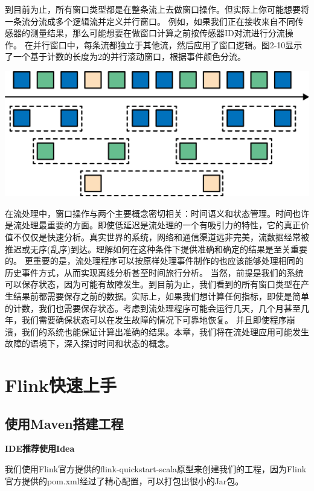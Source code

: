 \documentclass[oneside]{ctexbook}
\begin{document}
到目前为止，所有窗口类型都是在整条流上去做窗口操作。但实际上你可能想要将一条流分流成多个逻辑流并定义并行窗口。
例如，如果我们正在接收来自不同传感器的测量结果，那么可能想要在做窗口计算之前按传感器ID对流进行分流操作。
在并行窗口中，每条流都独立于其他流，然后应用了窗口逻辑。图2-10显示了一个基于计数的长度为2的并行滚动窗口，根据事件颜色分流。

\noindent\includegraphics[width=\textwidth]{spaf_0210.png}

在流处理中，窗口操作与两个主要概念密切相关：时间语义和状态管理。时间也许是流处理最重要的方面。即使低延迟是流处理的一个有吸引力的特性，它的真正价值不仅仅是快速分析。真实世界的系统，网络和通信渠道远非完美，流数据经常被推迟或无序(乱序)到达。理解如何在这种条件下提供准确和确定的结果是至关重要的。
更重要的是，流处理程序可以按原样处理事件制作的也应该能够处理相同的历史事件方式，从而实现离线分析甚至时间旅行分析。
当然，前提是我们的系统可以保存状态，因为可能有故障发生。到目前为止，我们看到的所有窗口类型在产生结果前都需要保存之前的数据。实际上，如果我们想计算任何指标，即使是简单的计数，我们也需要保存状态。考虑到流处理程序可能会运行几天，几个月甚至几年，我们需要确保状态可以在发生故障的情况下可靠地恢复。
并且即使程序崩溃，我们的系统也能保证计算出准确的结果。本章，我们将在流处理应用可能发生故障的语境下，深入探讨时间和状态的概念。

\chapter{Flink快速上手}

\section{使用Maven搭建工程}

\textbf{IDE推荐使用Idea}

我们使用Flink官方提供的flink-quickstart-scala原型来创建我们的工程，因为Flink官方提供的pom.xml经过了精心配置，可以打包出很小的Jar包。
\end{document}
